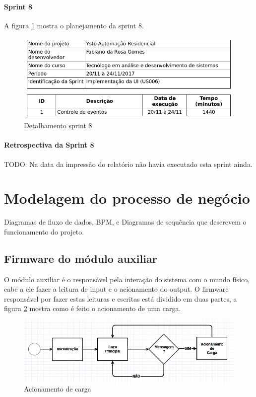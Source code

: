 \paragraph{Sprint 8} A figura \ref{sprint-8} mostra o planejamento da sprint 8.

\begin{figure}[H]
\caption{\label{sprint-8} Detalhamento sprint 8}
\includegraphics[scale=0.5]{img/sprint-8.png}
\end{figure}

\paragraph{Retrospectiva da Sprint 8}
TODO: Na data da impressão do relatório não havia executado esta sprint ainda.

\section{Modelagem do processo de negócio}
Diagramas de fluxo de dados, BPM, e Diagramas de sequência que descrevem o funcionamento do projeto.

\subsection{Firmware do módulo auxiliar}
O módulo auxiliar é o responsável pela interação do sistema com o mundo físico, cabe a ele fazer a leitura de input e o acionamento do output. O firmware responsável por fazer estas leituras e escritas está dividido em duas partes, a figura \ref{fw-acionamento} mostra como é feito o acionamento de uma carga.

\begin{figure}[H]
\caption{\label{fw-acionamento} Acionamento de carga}
\includegraphics[scale=0.5]{img/fw-acionamento.png}
\end{figure}

